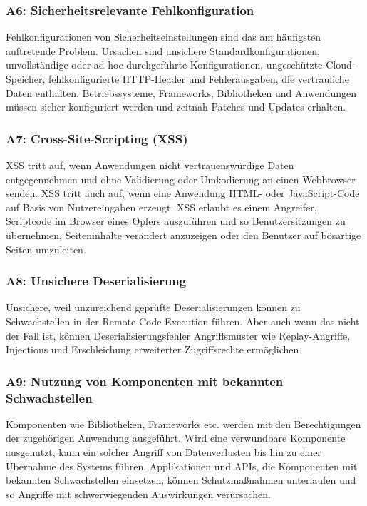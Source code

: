 \documentclass[12pt,oneside,a4paper,parskip]{scrbook}
\begin{document}
    \subsubsection{A6: Sicherheitsrelevante Fehlkonfiguration}
    Fehlkonfigurationen von Sicherheitseinstellungen sind das am häufigsten auftretende Problem.
    Ursachen sind unsichere Standardkonfigurationen, unvollständige oder ad-hoc durchgeführte
    Konfigurationen, ungeschützte Cloud-Speicher, fehlkonfigurierte HTTP-Header und Fehlerausgaben,
    die vertrauliche Daten enthalten. Betriebssysteme, Frameworks, Bibliotheken und Anwendungen
    müssen sicher konfiguriert werden und zeitnah Patches und Updates erhalten.

    \subsubsection{A7: Cross-Site-Scripting (XSS)}
    XSS tritt auf, wenn Anwendungen nicht vertrauenswürdige Daten entgegennehmen und ohne
    Validierung oder Umkodierung an einen Webbrowser senden. XSS tritt auch auf, wenn eine
    Anwendung HTML- oder JavaScript-Code auf Basis von Nutzereingaben erzeugt. XSS erlaubt es
    einem Angreifer, Scriptcode im Browser eines Opfers auszuführen und so Benutzersitzungen zu
    übernehmen, Seiteninhalte verändert anzuzeigen oder den Benutzer auf bösartige Seiten
    umzuleiten.

    \subsubsection{A8: Unsichere Deserialisierung}
    Unsichere, weil unzureichend geprüfte Deserialisierungen können zu Schwachstellen in der
    Remote-Code-Execution führen. Aber auch wenn das nicht der Fall ist, können
    Deserialisierungsfehler Angriffsmuster wie Replay-Angriffe, Injections und Erschleichung
    erweiterter Zugriffsrechte ermöglichen.

    \subsubsection{A9: Nutzung von Komponenten mit bekannten Schwachstellen}
    Komponenten wie Bibliotheken, Frameworks etc. werden mit den Berechtigungen der zugehörigen
    Anwendung ausgeführt. Wird eine verwundbare Komponente ausgenutzt, kann ein solcher
    Angriff von Datenverlusten bis hin zu einer Übernahme des Systems führen. Applikationen und
    APIs, die Komponenten mit bekannten Schwachstellen einsetzen, können Schutzmaßnahmen
    unterlaufen und so Angriffe mit schwerwiegenden Auswirkungen verursachen.
\end{document}
